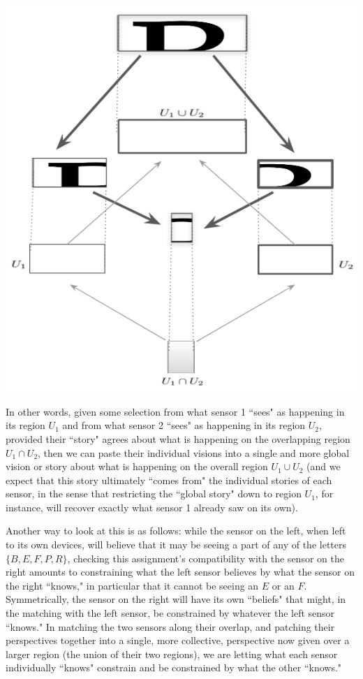 \documentclass[11pt]{book}
\theoremstyle{definition}
\theoremstyle{definition}
\theoremstyle{definition}
\theoremstyle{theorem}
\theoremstyle{definition}
\begin{document}
	\begin{center}
		\includegraphics[scale=0.3]{GoodDiagramB3.png}
	\end{center}
	In other words, given some selection from what sensor 1 ``sees" as happening in its region $U_1$ and from what sensor 2 ``sees" as happening in its region $U_2$, provided their ``story" agrees about what is happening on the overlapping region $U_1 \cap U_2$, then we can paste their individual visions into a single and more global vision or story about what is happening on the overall region $U_1 \cup U_2$ (and we expect that this story ultimately ``comes from" the individual stories of each sensor, in the sense that restricting the ``global story" down to region $U_1$, for instance, will recover exactly what sensor 1 already saw on its own). \par 
	Another way to look at this is as follows: while the sensor on the left, when left to its own devices, will believe that it may be seeing a part of any of the letters $\{B, E, F, P, R\}$, checking this assignment's compatibility with the sensor on the right amounts to constraining what the left sensor believes by what the sensor on the right ``knows," in particular that it cannot be seeing an $E$ or an $F$. Symmetrically, the sensor on the right will have its own ``beliefs" that might, in the matching with the left sensor, be constrained by whatever the left sensor ``knows." In matching the two sensors along their overlap, and patching their perspectives together into a single, more collective, perspective now given over a larger region (the union of their two regions), we are letting what each sensor individually ``knows" constrain and be constrained by what the other ``knows." \par 
\end{document}
